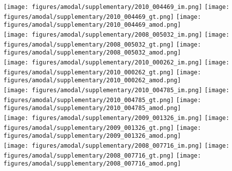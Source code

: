 \begin{figure*}
\centering\texttt{[image: figures/amodal/supplementary/2010\_004469\_im.png]}
\texttt{[image: figures/amodal/supplementary/2010\_004469\_gt.png]}
\texttt{[image: figures/amodal/supplementary/2010\_004469\_amod.png]} \\ 
\texttt{[image: figures/amodal/supplementary/2008\_005032\_im.png]}
\texttt{[image: figures/amodal/supplementary/2008\_005032\_gt.png]}
\texttt{[image: figures/amodal/supplementary/2008\_005032\_amod.png]} \\ 
\texttt{[image: figures/amodal/supplementary/2010\_000262\_im.png]}
\texttt{[image: figures/amodal/supplementary/2010\_000262\_gt.png]}
\texttt{[image: figures/amodal/supplementary/2010\_000262\_amod.png]} \\ 
\texttt{[image: figures/amodal/supplementary/2010\_004785\_im.png]}
\texttt{[image: figures/amodal/supplementary/2010\_004785\_gt.png]}
\texttt{[image: figures/amodal/supplementary/2010\_004785\_amod.png]} \\ 
\texttt{[image: figures/amodal/supplementary/2009\_001326\_im.png]}
\texttt{[image: figures/amodal/supplementary/2009\_001326\_gt.png]}
\texttt{[image: figures/amodal/supplementary/2009\_001326\_amod.png]} \\ 
\texttt{[image: figures/amodal/supplementary/2008\_007716\_im.png]}
\texttt{[image: figures/amodal/supplementary/2008\_007716\_gt.png]}
\texttt{[image: figures/amodal/supplementary/2008\_007716\_amod.png]} \\ 
\end{figure*}
